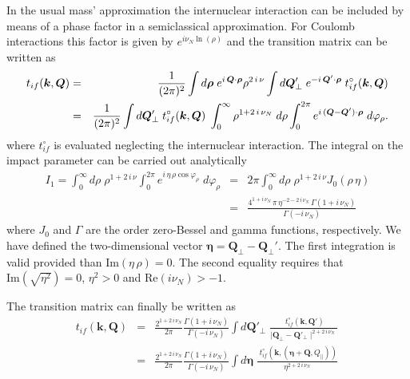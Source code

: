 In the usual mass' approximation the internuclear interaction can be
included by means of a phase factor in a semiclassical approximation.
For Coulomb interactions this factor is given by $e^{i
\nu_{N}\ln(\rho)}$ and the transition matrix can be written as
%
\begin{eqnarray}\label{Q:Npot-semic}
t_{if}(\bm{k},\bm{Q}) &=& \frac{1}{(2 \pi)^{2}} \int d \boldsymbol{\rho} \;
e^{i \, \bm{Q} \cdot \boldsymbol{\rho} } \rho^{2 \, i \, \nu} \int d
\bm{Q}_{\perp}' \; e^{- i \, \bm{Q}' \cdot \boldsymbol{\rho} } \;
t^{\circ}_{if}(\bm{k},\bm{Q}) \nonumber \\
  &=&
\frac{1}{(2 \pi)^{2}} \int d \bm{Q}_{\perp}' \;
t^{\circ}_{if}(\bm{k},\bm{Q}) \; \int_{0}^{\infty}  \rho^{ 1 + 2 \, i \,
\nu_{N}} \; d \rho \int_{0}^{2 \pi} e^{i \, (\bm{Q}- \bm{Q}')
\cdot \boldsymbol{\rho}} \; d \varphi_{\rho}.
\end{eqnarray}
%
where $t^{\circ}_{if}$ is evaluated neglecting the internuclear interaction.
The integral on the impact parameter can be carried out analytically
\begin{eqnarray}\label{Q:Npot-semic1}
I_{1}=\int_{0}^{\infty} d \rho \; \rho^{ 1 + 2 \, i \, \nu}
\int_{0}^{2 \pi} e^{i \, \eta\, \rho \cos{\varphi_{\rho}}} \;
d \varphi_{\rho} &=& 2 \pi \int_{0}^{\infty} d \rho \; \rho^{1 +
2 \, i \, \nu} J_{0}(\rho \,\eta)
  \\ &=&
\frac{{4^{1 + i\,\nu_{N}}}\,\pi \, \eta^{-2 - 2\, i\,\nu_{N}}\,
\Gamma(1 + i\,\nu_{N})} {\Gamma\left(- i\,\nu_{N} \right)}
\nonumber
\end{eqnarray}
where $J_{0}$ and $\Gamma$ are the order zero-Bessel and gamma
functions, respectively. We have defined the two-dimensional vector
$\bm{\eta}=\bm{Q}_{\perp}-\bm{Q}_{\perp}'$. The first integration is
valid provided than $\textrm{Im}\left(\eta \, \rho \right)=0$. The
second equality requires that $\textrm{Im}\left(\sqrt{\eta^{2}}
\right)=0$, $\eta^{2} > 0$ and $\textrm{Re}\left( i \nu_{N} \right)
> -1$.

The transition matrix can finally be written as
\begin{eqnarray}\label{Q:tifNsemic}
t_{if}(\bm{k},\bm{Q}) &=& \frac{2^{1 + 2\,i\,\nu_{N}}}{2 \pi}
\frac{\Gamma(1 + i\,\nu_{N})} {\Gamma\left(- i\,\nu_{N} \right)}
\int d \bm{Q}'_{\perp} \; \frac{\; t^{\circ}_{if}(\bm{k},\bm{Q}')} {\mid
\bm{Q}_{\perp}-\bm{Q}'_{\perp}\mid ^{2 + 2\, i\,\nu_{N}}}\,
\nonumber
\\
&=& \frac{2^{1 + 2\,i\,\nu_{N}}}{2 \pi} \frac{\Gamma(1 +
i\,\nu_{N})} {\Gamma\left(- i\,\nu_{N} \right)} \int d
\bm{\eta} \; \frac{\; t^{\circ}_{if}(\bm{k},(\bm{\eta}+\bm{Q},Q_{\parallel}))}
{\eta^{2 + 2\, i\,\nu_{N}}}\,
\end{eqnarray}

